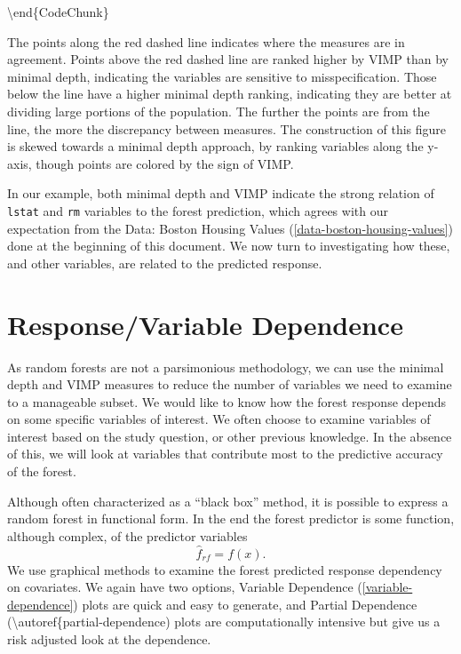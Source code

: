 \documentclass[article]{jss}
\begin{document}
\textbackslash{}end\{CodeChunk\}

The points along the red dashed line indicates where the measures are in
agreement. Points above the red dashed line are ranked higher by VIMP
than by minimal depth, indicating the variables are sensitive to
misspecification. Those below the line have a higher minimal depth
ranking, indicating they are better at dividing large portions of the
population. The further the points are from the line, the more the
discrepancy between measures. The construction of this figure is skewed
towards a minimal depth approach, by ranking variables along the y-axis,
though points are colored by the sign of VIMP.

In our example, both minimal depth and VIMP indicate the strong relation
of \texttt{lstat} and \texttt{rm} variables to the forest prediction,
which agrees with our expectation from the Data: Boston Housing Values
(\autoref{data-boston-housing-values}) done at the beginning of this
document. We now turn to investigating how these, and other variables,
are related to the predicted response.

\hypertarget{responsevariable-dependence}{%
\section{Response/Variable
Dependence}\label{responsevariable-dependence}}

As random forests are not a parsimonious methodology, we can use the
minimal depth and VIMP measures to reduce the number of variables we
need to examine to a manageable subset. We would like to know how the
forest response depends on some specific variables of interest. We often
choose to examine variables of interest based on the study question, or
other previous knowledge. In the absence of this, we will look at
variables that contribute most to the predictive accuracy of the forest.

Although often characterized as a ``black box'' method, it is possible
to express a random forest in functional form. In the end the forest
predictor is some function, although complex, of the predictor variables
\[\hat{f}_{rf} = f(x).\] We use graphical methods to examine the forest
predicted response dependency on covariates. We again have two options,
Variable Dependence (\autoref{variable-dependence}) plots are quick and
easy to generate, and Partial Dependence
(\textbackslash{}autoref\{partial-dependence) plots are computationally
intensive but give us a risk adjusted look at the dependence.
\end{document}
